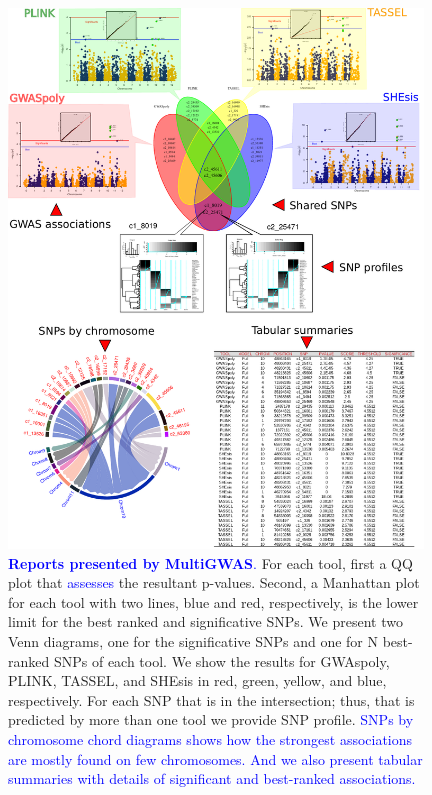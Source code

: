 \documentclass{article}
\begin{document}
\begin{figure}
\includegraphics[width=11cm]{images/report-methodologies-all-plots} \caption{\textbf{\textcolor{blue}{Reports presented by MultiGWAS}}\textcolor{blue}{.} For each tool, first a QQ plot that \textcolor{blue}{assesses} the resultant p-values. Second, a Manhattan plot for each tool with two lines, blue and red, respectively, is the lower limit for the best ranked and significative SNPs. We present two Venn diagrams, one for the significative SNPs and one for N best-ranked SNPs of each tool. We show the results for GWAspoly, PLINK, TASSEL, and SHEsis in red, green, yellow, and blue, respectively. For each SNP that is in the intersection; thus, that is predicted by more than one tool we provide SNP profile. \textcolor{blue}{SNPs by chromosome chord diagrams shows how the strongest associations are mostly found on few chromosomes. And we also present tabular summaries with details of significant and best-ranked associations. }\label{fig:Reports} }
\end{figure}
\end{document}

